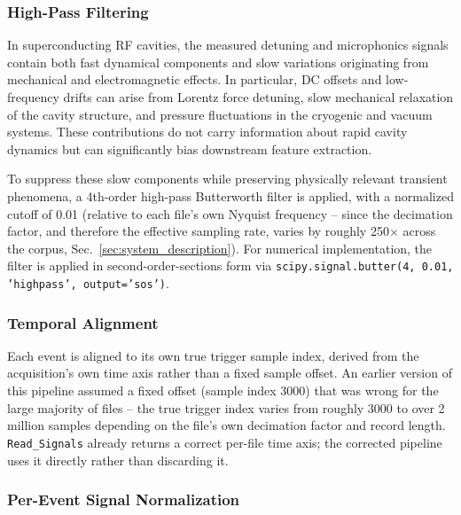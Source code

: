 \subsubsection{High-Pass Filtering}

In superconducting RF cavities, the measured detuning and microphonics signals contain both fast dynamical components and slow variations originating from mechanical and electromagnetic effects. In particular, DC offsets and low-frequency drifts can arise from Lorentz force detuning, slow mechanical relaxation of the cavity structure, and pressure fluctuations in the cryogenic and vacuum systems. These contributions do not carry information about rapid cavity dynamics but can significantly bias downstream feature extraction.

To suppress these slow components while preserving physically relevant transient phenomena, a 4th-order high-pass Butterworth filter is applied, with a normalized cutoff of 0.01 (relative to each file's own Nyquist frequency -- since the decimation factor, and therefore the effective sampling rate, varies by roughly 250$\times$ across the corpus, Sec.~\ref{sec:system_description}). For numerical implementation, the filter is applied in second-order-sections form via \texttt{scipy.signal.butter(4, 0.01, 'highpass', output='sos')}. %

\subsubsection{Temporal Alignment}

Each event is aligned to its own true trigger sample index, derived from the acquisition's own time axis rather than a fixed sample offset. An earlier version of this pipeline assumed a fixed offset (sample index 3000) that was wrong for the large majority of files -- the true trigger index varies from roughly 3000 to over 2 million samples depending on the file's own decimation factor and record length. \texttt{Read\_Signals} already returns a correct per-file time axis; the corrected pipeline uses it directly rather than discarding it. %

\subsubsection{Per-Event Signal Normalization}

